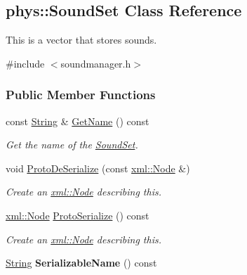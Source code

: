 \hypertarget{classphys_1_1SoundSet}{
\subsection{phys::SoundSet Class Reference}
\label{classphys_1_1SoundSet}
}


This is a vector that stores sounds.  




{\ttfamily \#include $<$soundmanager.h$>$}

\subsubsection*{Public Member Functions}
\begin{DoxyCompactItemize}
\item 
const \hyperlink{namespacephys_aa03900411993de7fbfec4789bc1d392e}{String} \& \hyperlink{classphys_1_1SoundSet_aa26c72befe51f514b24b652932ad1bc9}{GetName} () const 
\begin{DoxyCompactList}\small\item\em Get the name of the \hyperlink{classphys_1_1SoundSet}{SoundSet}. \item\end{DoxyCompactList}\item 
void \hyperlink{classphys_1_1SoundSet_a5734b8cf5370036fea6d41b6659eca8e}{ProtoDeSerialize} (const \hyperlink{classphys_1_1xml_1_1Node}{xml::Node} \&)
\begin{DoxyCompactList}\small\item\em Create an \hyperlink{classphys_1_1xml_1_1Node}{xml::Node} describing this. \item\end{DoxyCompactList}\item 
\hyperlink{classphys_1_1xml_1_1Node}{xml::Node} \hyperlink{classphys_1_1SoundSet_ab8202b748768b338505928cdece9d08c}{ProtoSerialize} () const 
\begin{DoxyCompactList}\small\item\em Create an \hyperlink{classphys_1_1xml_1_1Node}{xml::Node} describing this. \item\end{DoxyCompactList}\item 
\hypertarget{classphys_1_1SoundSet_a3cda7016b61a7da7f0c42e0bcc76d809}{
\hyperlink{namespacephys_aa03900411993de7fbfec4789bc1d392e}{String} {\bfseries SerializableName} () const }
\label{classphys_1_1SoundSet_a3cda7016b61a7da7f0c42e0bcc76d809}


\end{DoxyCompactItemize}
